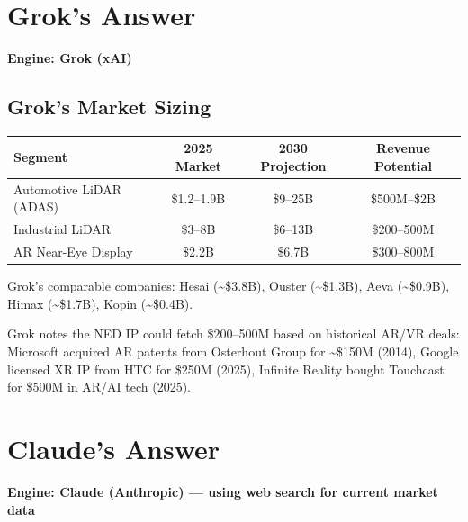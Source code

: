 \documentclass[11pt,letterpaper]{article}
\begin{document}
\section{Grok's Answer}

{\small\color{grokred}\textbf{Engine: Grok (xAI)}}


\subsection{Grok's Market Sizing}

\begin{center}
\begin{tabular}{@{}lccc@{}}
\toprule
\textbf{Segment} & \textbf{2025 Market} & \textbf{2030 Projection} & \textbf{Revenue Potential} \\
\midrule
Automotive LiDAR (ADAS) & \$1.2--1.9B & \$9--25B & \$500M--\$2B \\
Industrial LiDAR & \$3--8B & \$6--13B & \$200--500M \\
AR Near-Eye Display & \$2.2B & \$6.7B & \$300--800M \\
\bottomrule
\end{tabular}
\end{center}

Grok's comparable companies: Hesai (\textasciitilde\$3.8B), Ouster (\textasciitilde\$1.3B), Aeva (\textasciitilde\$0.9B), Himax (\textasciitilde\$1.7B), Kopin (\textasciitilde\$0.4B).

Grok notes the NED IP could fetch \$200--500M based on historical AR/VR deals: Microsoft acquired AR patents from Osterhout Group for \textasciitilde\$150M (2014), Google licensed XR IP from HTC for \$250M (2025), Infinite Reality bought Touchcast for \$500M in AR/AI tech (2025).

\section{Claude's Answer}

{\small\color{claudeblue}\textbf{Engine: Claude (Anthropic) --- using web search for current market data}}

\end{document}
